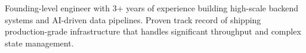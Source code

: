 \documentclass[letter,10pt]{article}
\begin{document}
Founding-level engineer with 3+ years of experience building high-scale backend systems and AI-driven data pipelines. Proven track record of shipping production-grade infrastructure that handles significant throughput and complex state management.
\end{document}
